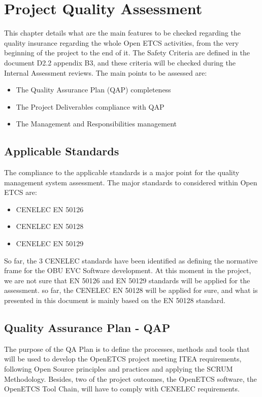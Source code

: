 \documentclass{template/openetcs_article}
\begin{document}
\section{Project Quality Assessment}
This chapter details what are the main features to be checked regarding the quality insurance regarding the whole Open ETCS activities, from the very beginning of the project to the end of it.
The Safety Criteria are defined in the document D2.2 appendix B3, and these criteria will be checked during the Internal Assessment reviews. The main points to be assessed are:
\begin{itemize}
\item The Quality Assurance Plan (QAP) completeness
\item The Project Deliverables compliance with QAP
\item The Management and Responsibilities management 
\end{itemize}

\subsection{Applicable Standards}
The compliance to the applicable standards is a major point for the quality management system assessment.
The major standards to considered within Open ETCS are:
\begin{itemize}
\item CENELEC EN 50126 \cite{EN50126:2000}
\item CENELEC EN 50128 \cite{EN50128:2011}
\item CENELEC EN 50129 \cite{EN50129:2003}
\end{itemize}

So far, the 3 CENELEC standards have been identified as defining the normative frame for the OBU EVC Software development. At this moment in the project, we are not sure that EN 50126 and EN 50129 standards will  be applied for the assessment. so far, the CENELEC EN 50128 will be applied for sure, and what is presented in this document is mainly based on the EN 50128 standard.

\subsection{Quality Assurance Plan - QAP}
The purpose of the QA Plan is to define the processes, methods and tools that will be used to develop the OpenETCS project meeting ITEA requirements, following Open Source principles and practices and applying the SCRUM Methodology. Besides, two of the project outcomes, the OpenETCS software, the OpenETCS Tool Chain, will have to comply with CENELEC requirements.
\end{document}
